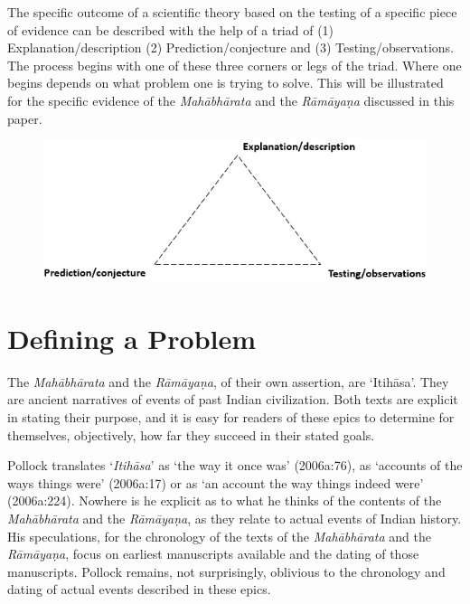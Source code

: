 The specific outcome of a scientific theory based on the testing of a specific piece of evidence can be described with the help of a triad of (1) Explanation/description (2) Prediction/conjecture and (3) Testing/observations. The process begins with one of these three corners or legs of the triad. Where one begins depends on what problem one is trying to solve. This will be illustrated for the specific evidence of the \textit{Mahābhārata} and the \textit{Rāmāyaṇa} discussed in this paper.

\begin{figure}[!h]
\includegraphics[scale=.5]{images/chap2-1.jpg}
\end{figure}


\section*{Defining a Problem}

The \textit{Mahābhārata} and the \textit{Rāmāyaṇa}, of their own assertion, are ‘Itihāsa’. They are ancient narratives of events of past Indian civilization. Both texts are explicit in stating their purpose, and it is easy for readers of these epics to determine for themselves, objectively, how far they succeed in their stated goals.

Pollock translates ‘\textit{Itihāsa}’ as ‘the way it once was’ (2006a:76), as ‘accounts of the ways things were’ (2006a:17) or as ‘an account the way things indeed were’ (2006a:224). Nowhere is he explicit as to what he thinks of the contents of the \textit{Mahābhārata} and the \textit{Rāmāyaṇa}, as they relate to actual events of Indian history. His speculations, for the chronology of the texts of the \textit{Mahābhārata} and the \textit{Rāmāyaṇa}, focus on earliest manuscripts available and the dating of those manuscripts. Pollock remains, not surprisingly, oblivious to the chronology and dating of actual events described in these epics.

